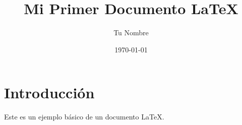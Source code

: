 \documentclass{article}
\title{Mi Primer Documento LaTeX}
\author{Tu Nombre}
\date{\today}
\begin{document}
	
	\maketitle
	
	\section{Introducción}
	Este es un ejemplo básico de un documento LaTeX.
	
\end{document}
